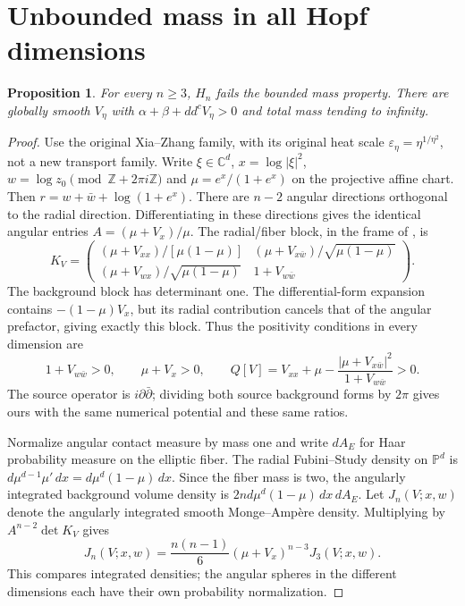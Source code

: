 \documentclass[11pt]{article}
\newcommand{\ddc}{dd^c}
\newcommand{\PP}{\mathbb P}
\newtheorem{proposition}[theorem]{Proposition}
\theoremstyle{remark}\newtheorem{remark}[theorem]{Remark}
\begin{document}
\section{Unbounded mass in all Hopf dimensions}\label{sec:bmp}
\begin{proposition}\label{prop:bmp}
For every $n\ge3$, $H_n$ fails the bounded mass property.
There are globally smooth $V_\eta$ with
$\alpha+\beta+\ddc V_\eta>0$ and total mass tending to infinity.
\end{proposition}
\begin{proof}
Use the original Xia--Zhang family, with its original heat scale
$\varepsilon_\eta=\eta^{1/\eta^2}$, not a new transport family.
Write $\xi\in\mathbb C^d$, $x=\log|\xi|^2$,
$w=\log z_0\pmod{\mathbb Z+2\pi i\mathbb Z}$ and
$\mu=e^x/(1+e^x)$ on the projective affine chart. Then
$r=w+\bar w+\log(1+e^x)$.
There are $n-2$ angular directions orthogonal to the radial direction.
Differentiating in these directions gives the identical angular
entries $A=(\mu+V_x)/\mu$. The radial/fiber block, in the frame
of \cite[Lemma 2.2]{XZ}, is
\[
 K_V=\begin{pmatrix}
 (\mu+V_{xx})/[\mu(1-\mu)]&
 (\mu+V_{x\bar w})/\sqrt{\mu(1-\mu)}\\
 (\mu+V_{wx})/\sqrt{\mu(1-\mu)}&1+V_{w\bar w}
 \end{pmatrix}.
\]
The background block has determinant one. The differential-form
expansion contains $-(1-\mu)V_x$, but its radial contribution
cancels that of the angular prefactor, giving exactly this block.
Thus the positivity conditions in every dimension are
\[
 1+V_{w\bar w}>0,\qquad \mu+V_x>0,\qquad
 Q[V]=V_{xx}+\mu-\frac{|\mu+V_{x\bar w}|^2}{1+V_{w\bar w}}>0.
\]
The source operator is $i\partial\bar\partial$; dividing both
source background forms by $2\pi$ gives ours with the same
numerical potential and these same ratios.

Normalize angular contact measure by mass one and write $dA_E$
for Haar probability measure on the elliptic fiber. The radial
Fubini--Study density on $\PP^d$ is
$d\mu^{d-1}\mu'\,dx=d\mu^d(1-\mu)\,dx$.
Since the fiber mass is two, the angularly integrated background
volume density is $2nd\mu^d(1-\mu)\,dx\,dA_E$.
Let $J_n(V;x,w)$ denote the angularly integrated smooth
Monge--Amp\`ere density. Multiplying by $A^{n-2}\det K_V$ gives
\[
 J_n(V;x,w)=\frac{n(n-1)}6(\mu+V_x)^{n-3}J_3(V;x,w).
 \tag{7}
\]
This compares integrated densities; the angular spheres in the
different dimensions each have their own probability normalization.


\end{proof}
\end{document}
